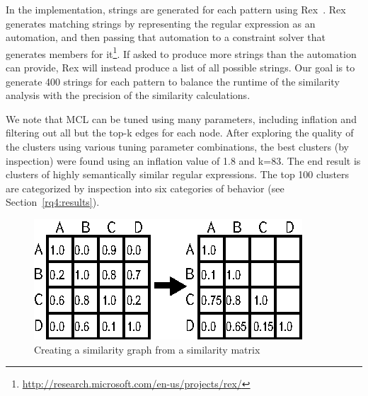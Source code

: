 In the implementation, strings are generated for each pattern using Rex~\cite{rex}.  Rex generates matching strings by representing the regular expression as an automation, and then passing that automation to a constraint solver that generates members for it\footnote{\url{http://research.microsoft.com/en-us/projects/rex/}}.  If asked to produce more strings than the automation can provide, Rex will instead produce a list of all possible strings.
Our goal is to generate 400 strings for each pattern to balance the runtime of the similarity analysis with the precision of the similarity calculations.

We note that MCL can be tuned using many parameters, including inflation and filtering out all but the top-k edges for each node.
After exploring the quality of the clusters using various tuning parameter combinations, the best clusters (by inspection) were found using an inflation value of 1.8 and k=83.
The end result is clusters of highly semantically similar regular expressions.  The top 100 clusters are categorized by inspection into six categories of behavior (see Section~\ref{rq4:results}).


\begin{figure}[tb]
\centering
\includegraphics[width=\columnwidth]{../illustrations/matrixToGraph.eps}
\vspace{-6pt}
\caption{Creating a similarity graph from a similarity matrix}
\vspace{-6pt}
\label{fig:matrixToGraph}
\end{figure}


%
%

